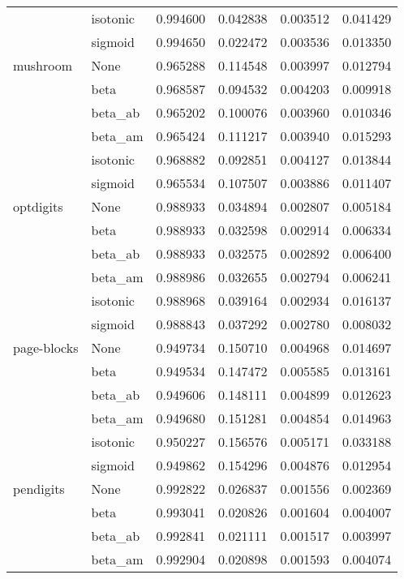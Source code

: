 \begin{tabular}{llrrrr}
        & isotonic &  0.994600 &  0.042838 &  0.003512 &  0.041429 \\
        & sigmoid &  0.994650 &  0.022472 &  0.003536 &  0.013350 \\
mushroom & None &  0.965288 &  0.114548 &  0.003997 &  0.012794 \\
        & beta &  0.968587 &  0.094532 &  0.004203 &  0.009918 \\
        & beta\_ab &  0.965202 &  0.100076 &  0.003960 &  0.010346 \\
        & beta\_am &  0.965424 &  0.111217 &  0.003940 &  0.015293 \\
        & isotonic &  0.968882 &  0.092851 &  0.004127 &  0.013844 \\
        & sigmoid &  0.965534 &  0.107507 &  0.003886 &  0.011407 \\
optdigits & None &  0.988933 &  0.034894 &  0.002807 &  0.005184 \\
        & beta &  0.988933 &  0.032598 &  0.002914 &  0.006334 \\
        & beta\_ab &  0.988933 &  0.032575 &  0.002892 &  0.006400 \\
        & beta\_am &  0.988986 &  0.032655 &  0.002794 &  0.006241 \\
        & isotonic &  0.988968 &  0.039164 &  0.002934 &  0.016137 \\
        & sigmoid &  0.988843 &  0.037292 &  0.002780 &  0.008032 \\
page-blocks & None &  0.949734 &  0.150710 &  0.004968 &  0.014697 \\
        & beta &  0.949534 &  0.147472 &  0.005585 &  0.013161 \\
        & beta\_ab &  0.949606 &  0.148111 &  0.004899 &  0.012623 \\
        & beta\_am &  0.949680 &  0.151281 &  0.004854 &  0.014963 \\
        & isotonic &  0.950227 &  0.156576 &  0.005171 &  0.033188 \\
        & sigmoid &  0.949862 &  0.154296 &  0.004876 &  0.012954 \\
pendigits & None &  0.992822 &  0.026837 &  0.001556 &  0.002369 \\
        & beta &  0.993041 &  0.020826 &  0.001604 &  0.004007 \\
        & beta\_ab &  0.992841 &  0.021111 &  0.001517 &  0.003997 \\
        & beta\_am &  0.992904 &  0.020898 &  0.001593 &  0.004074 \\

\end{tabular}
